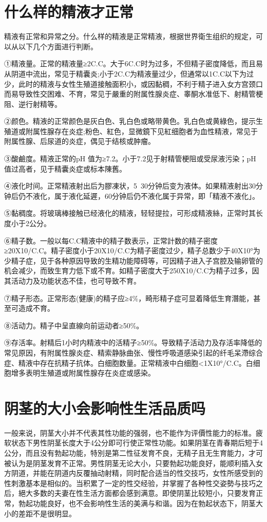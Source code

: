 \documentclass[12pt,UTF8]{ctexbook}
\begin{document}
\section{什么样的精液才正常}

精液有正常和异常之分。什么样的精液是正常精液，根据世界衛生组织的规定，可以从以下几个方面进行判断。

①精液量。正常的精液量≥2C.C。大于6C.C时为过多，不但精子密度降低，而且易从阴道中流出，常见于精囊炎;小于2C.C为精液量过少，但通常以1C.C以下为过少，此时的精液与女性生殖道接触面积小，或因黏稠，不利于精子进入女方宫颈口而易导致性交困难、不育，常见于嚴重的附属性腺炎症、睾酮水准低下、射精管梗阻、逆行射精等。

②颜色。精液的正常颜色是灰白色、乳白色或略带黄色。乳白色或黄綠色，提示生殖道或附属性腺存在炎症;粉色、紅色，显微鏡下见紅细胞者为血性精液，常见于附属性腺、后尿道的炎症，偶见于结核或肿瘤。

③酸鹼度。精液正常的pH 值为≥7.2。小于7.2见于射精管梗阻或受尿液污染；pH值过高者，见于精囊炎症或标本陳舊。

④液化时间。正常精液射出后为膠凍状，5~30分钟后变为液体。如果精液射出30分钟后仍不液化，属于液化延遲，60分钟后仍不液化属于异常，即「精液不液化」。

⑤黏稠度。将玻璃棒接触已经液化的精液，轻轻提拉，可形成精液絲，正常时其长度小于2公分。

⑥精子数。一般以每C.C精液中的精子数表示，正常計数的精子密度≥20X10/C.C。精子密度小于20X10/C.C为精子密度过少，精子总数少于40X10°为少精子症，见于各种原因导致的生精功能障碍等，可因精子进入子宫腔及输卵管的机会减少，而致生育力低下或不育。如精子密度大于250X10/C.C为精子过多，因其活动力及功能状态不佳，也可导致不育。

⑦精子形态。正常形态(健康)的精子应≥4\%，畸形精子症可显着降低生育潛能，甚至可造成不育。

⑧活动力。精子中呈直線向前运动者≥50\%。

⑨存活率。射精后1小时内精液中的活精子≥50\%。导致精子活动力及存活率降低的常见原因，有附属性腺炎症、精索静脉曲张、慢性呼吸道感染引起的纤毛呆滯综合症、精液中存在抗精子抗体。白细胞数量。正常精液中白细胞<1X10°/C.C。白细胞增多表明生殖道或附属性腺存在炎症或感染。



\section{阴茎的大小会影响性生活品质吗}

一般来说，阴茎大小并不代表其性功能的强弱，也不能作为评價性能力的标准。疲软状态下男性阴茎长度大于4公分即可行使正常性功能。如果阴茎在青春期后短于4公分，而且没有勃起功能，特別是第二性征发育不良，无精子且无生育能力，才可被认为是阴茎发育不正常。男性阴茎无论大小，只要勃起功能良好，能顺利插入女方阴道，并能在阴道内反覆抽动射精，同时配合适当的性交技巧，女性所感受到的性刺激基本是相似的。当积累了一定的性交经验，并掌握了各种性交姿勢与技巧之后，絕大多数的夫妻在性生活方面都会感到满意。即使阴茎比较短小，只要发育正常，勃起功能良好，也不会影响性生活的美满与和谐。因为在勃起状态下，阴茎大小的差距不是很明显。
\end{document}
